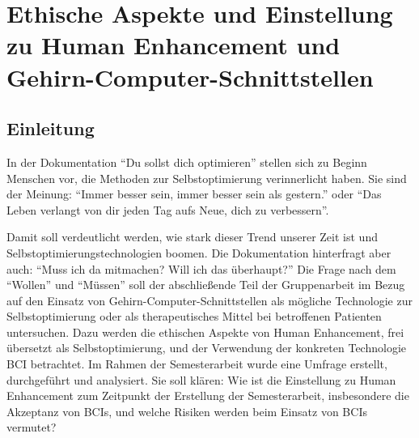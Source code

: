 \documentclass[11pt,ngerman,parskip=half]{scrartcl}
\begin{document}
\pagebreak
\section{Ethische Aspekte und Einstellung zu Human Enhancement und Gehirn-Computer-Schnittstellen}
\label{sec:kathrin}
\subsection{Einleitung}
\label{subsec:kathrin_einleitung}
In der Dokumentation \enquote{Du sollst dich optimieren} stellen sich zu
Beginn Menschen vor, die Methoden zur Selbstoptimierung verinnerlicht haben.
Sie sind der Meinung: \enquote{Immer besser sein, immer besser sein als
gestern.} oder \enquote{Das Leben verlangt von dir jeden Tag aufs Neue, dich
zu verbessern}. \parencite[][Min. 0--1]{dettmer-finke_du_2017}

Damit soll verdeutlicht werden, wie stark dieser Trend unserer Zeit ist und
Selbstoptimierungstechnologien boomen.
\parencite[vgl.][]{defi-filmproduktion_text_2018} Die Dokumentation
hinterfragt aber auch: \enquote{Muss ich da mitmachen? Will ich das
überhaupt?} \parencite[][Min. 1--2]{dettmer-finke_du_2017} Die Frage nach dem
\enquote{Wollen} und \enquote{Müssen} soll der abschließende Teil der
Gruppenarbeit im Bezug auf den Einsatz von Gehirn-Computer-Schnittstellen als
mögliche Technologie zur Selbstoptimierung oder als therapeutisches Mittel
bei betroffenen Patienten untersuchen. Dazu werden die ethischen Aspekte von
Human Enhancement, frei übersetzt als Selbstoptimierung, und der Verwendung
der konkreten Technologie BCI betrachtet. Im Rahmen der Semesterarbeit wurde
eine Umfrage erstellt, durchgeführt und analysiert. Sie soll klären: Wie ist
die Einstellung zu Human Enhancement zum Zeitpunkt der Erstellung der
Semesterarbeit, insbesondere die Akzeptanz von BCIs, und welche Risiken
werden beim Einsatz von BCIs vermutet?
\end{document}
